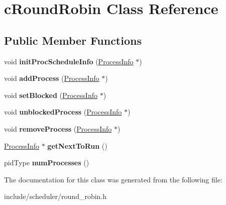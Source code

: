 \hypertarget{classcRoundRobin}{\section{c\-Round\-Robin \-Class \-Reference}
\label{dc/dcc/classcRoundRobin}
}
\subsection*{\-Public \-Member \-Functions}
\begin{DoxyCompactItemize}
\item 
\hypertarget{classcRoundRobin_aadb221df9b12f61c3151996ea5c09741}{void {\bfseries init\-Proc\-Schedule\-Info} (\hyperlink{structProcessInfo}{\-Process\-Info} $\ast$)}\label{dc/dcc/classcRoundRobin_aadb221df9b12f61c3151996ea5c09741}

\item 
\hypertarget{classcRoundRobin_a3571d05a8daebccb758d63b8327f8a22}{void {\bfseries add\-Process} (\hyperlink{structProcessInfo}{\-Process\-Info} $\ast$)}\label{dc/dcc/classcRoundRobin_a3571d05a8daebccb758d63b8327f8a22}

\item 
\hypertarget{classcRoundRobin_a13609de0f36c81a780072f9c0730f963}{void {\bfseries set\-Blocked} (\hyperlink{structProcessInfo}{\-Process\-Info} $\ast$)}\label{dc/dcc/classcRoundRobin_a13609de0f36c81a780072f9c0730f963}

\item 
\hypertarget{classcRoundRobin_a81d0cd6050ebff3c72ca1e829f2d4991}{void {\bfseries unblocked\-Process} (\hyperlink{structProcessInfo}{\-Process\-Info} $\ast$)}\label{dc/dcc/classcRoundRobin_a81d0cd6050ebff3c72ca1e829f2d4991}

\item 
\hypertarget{classcRoundRobin_a1bc7bfc4c36bdbe3f3938810817d885e}{void {\bfseries remove\-Process} (\hyperlink{structProcessInfo}{\-Process\-Info} $\ast$)}\label{dc/dcc/classcRoundRobin_a1bc7bfc4c36bdbe3f3938810817d885e}

\item 
\hypertarget{classcRoundRobin_ac26b32260ffb68bfa3c084ca5ca7ff87}{\hyperlink{structProcessInfo}{\-Process\-Info} $\ast$ {\bfseries get\-Next\-To\-Run} ()}\label{dc/dcc/classcRoundRobin_ac26b32260ffb68bfa3c084ca5ca7ff87}

\item 
\hypertarget{classcRoundRobin_afa0cdfcfc0b8222d39ad5e9c23db1f25}{pid\-Type {\bfseries num\-Processes} ()}\label{dc/dcc/classcRoundRobin_afa0cdfcfc0b8222d39ad5e9c23db1f25}

\end{DoxyCompactItemize}


\-The documentation for this class was generated from the following file\-:\begin{DoxyCompactItemize}
\item 
include/scheduler/round\-\_\-robin.\-h\end{DoxyCompactItemize}

